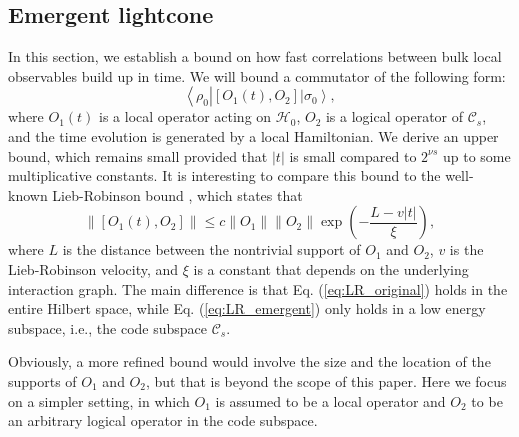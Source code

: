 \documentclass[a4paper,11pt]{article}
\newcommand{\bra}[1]{\left\langle #1 \right|}
\newcommand{\ket}[1]{\left|#1\right\rangle}
\newcommand{\1}{\mathbbm{1}}
\newcommand{\cC}{\mathcal{C}}
\begin{document}
\subsection{Emergent lightcone}\label{sec:LR}
In this section, we establish a bound on how fast correlations between bulk local observables build up in time.
We will bound a commutator of the following form:
\begin{equation}
\bra{\rho_0}[O_1(t), O_2]\ket{\sigma_0},\label{eq:LR_emergent}
\end{equation}
where $O_1(t)$ is a local operator acting on $\mathcal{H}_0$, $O_2$ is a logical operator of $\cC_s$, and the time evolution is generated by a local Hamiltonian. We derive an upper bound, which remains  small provided that $|t|$ is  small compared to $2^{\nu s}$ up to some multiplicative constants. It is interesting to compare this bound to the well-known Lieb-Robinson bound \cite{Lieb1972}, which states that
\begin{equation}
\|[O_1(t),O_2]\|\leq c \| O_1 \| \| O_2 \|\exp(-\frac{L-v|t|}{\xi}), \label{eq:LR_original}
\end{equation}
where $L$ is the distance between the nontrivial support of $O_1$ and $O_2$, $v$ is the Lieb-Robinson velocity, and $\xi$ is a constant that depends on the underlying interaction graph. The main difference is that Eq. (\ref{eq:LR_original}) holds in the entire Hilbert space, while Eq. (\ref{eq:LR_emergent}) only holds in a low energy subspace, i.e., the code subspace $\cC_s$.

Obviously, a more refined bound would involve the size and the location of the supports of $O_1$ and $O_2$, but that is beyond the scope of this paper. Here we focus on a simpler setting, in which $O_1$ is assumed to be a local operator and $O_2$ to be an arbitrary logical operator in the code subspace.
\end{document}
